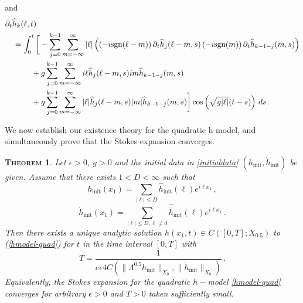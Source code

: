 \documentclass[11pt]{article}
\theoremstyle{plain}
\newtheorem{theorem}{\scshape Theorem}
\theoremstyle{definition}
\theoremstyle{definition}
\def\p{\text{\bf\emph{p}}}
\def\ft #1{{\widehat{#1}}}
\def\p{{\partial\hspace{1pt}}}
\def\hinit{h_{\operatorname{init}}}
\def\fhinit{\widehat{{ h}}_{\operatorname{init}}}
\def\htinit{{\dot h}_{\operatorname{init}}}
\def\fhtinit{\widehat{{\dot h}}_{\operatorname{init}}}
\begin{document}
and
\begin{align}
& \p_{\!t} \ft{h}_k(\ell,t) \nonumber\\
&\quad = \int_0^t\bigg{[}-\sum_{j=0}^{k-1}\sum_{m=-\infty}^{\infty}|\ell|\left(\left(-i\text{sgn}(\ell-m)\right)\p_{\!t}\ft{h}_{j}(\ell-m,s)\left(-i\text{sgn}(m)\right)\p_{\!t}\ft{h}_{k-1-j}(m,s)\right)\nonumber\\
&\qquad\quad\ + g\sum_{j=0}^{k-1}\sum_{m=-\infty}^{\infty} i\ell\ft{h}_{j}(\ell-m,s)im \ft{h}_{k-1-j}(m,s)\nonumber\\
&\qquad\quad\ + g\sum_{j=0}^{k-1}\sum_{m=-\infty}^{\infty}|\ell|\ft{h}_{j}(\ell-m,s)|m|\ft{h}_{k-1-j}(m,s)\bigg{]} \cos\left( \sqrt{g|\ell|} (t-s)\right) \,ds\,.\label{eq:recurrence2}
\end{align}

We now establish our existence theory for the quadratic h-model, and simultaneously prove that the Stokes expansion converges.
\begin{theorem}\label{theorem1} Let $\epsilon>0$, $g > 0$ and the initial data in \eqref{initialdata} $(\hinit, \htinit)$ be given. Assume that there exists $1<D<\infty$ such that
$$
\hinit(x_1)=\sum_{|\ell|\leq D}\fhinit(\ell)e^{i\ell x_1}\,,
$$
$$
\htinit(x_1)=\sum_{|\ell|\leq D,\ell\neq0}\fhtinit(\ell)e^{i\ell x_1}\,.
$$
Then there exists a unique analytic solution $h(x_1,t)\in C([0,T];X_{0.5})$ to {\rm(\ref{hmodel-quad})} for $t$ in the time interval $[0,T]$ with
$$
T=\frac{1}{e \epsilon 4C(\|\Lambda^{0.5}\hinit\|_{X_0},\|\htinit\|_{X_0})} \,.
$$
Equivalently, the Stokes expansion for the quadratic $h-$model \eqref{hmodel-quad} converges for arbitrary $\epsilon>0$  and $T>0$
taken sufficiently small.
\end{theorem}
\end{document}

